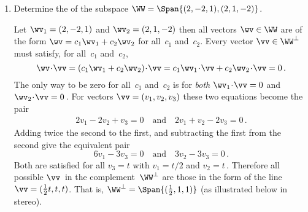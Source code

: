 \begin{reduce}
\begin{example}
\begin{enumerate}[ref=\ref{eg:orthsubsp}(\alph*)]
\item Determine the  of the subspace \(\WW=\Span\{(2,-2,1),(2,1,-2)\}\).
\begin{solution} 
Let \(\wv_1=(2,-2,1)\) and \(\wv_2=(2,1,-2)\) then all vectors \(\wv\in\WW\) are of the form \(\wv=c_1\wv_1+c_2\wv_2\) for all~\(c_1\) and~\(c_2\).
Every vector \(\vv\in\WW^\perp\) must satisfy, for all~\(c_1\) and~\(c_2\),
\begin{equation*}
\wv\cdot\vv=(c_1\wv_1+c_2\wv_2)\cdot\vv
=c_1\wv_1\cdot\vv+c_2\wv_2\cdot\vv
=0\,.
\end{equation*}
The only way to be zero for all~\(c_1\) and~\(c_2\) is for \emph{both} \(\wv_1\cdot\vv=0\) and \(\wv_2\cdot\vv=0\)\,.
For vectors \(\vv=(v_1,v_2,v_3)\) these two equations become the pair
\begin{eqnarray*}
2v_1-2v_2+v_3=0 \quad\text{and}\quad 2v_1+v_2-2v_3=0\,.
\end{eqnarray*}
Adding twice the second to the first, and subtracting the first from the second give the equivalent pair
\begin{equation*}
6v_1-3v_3=0\quad\text{and}\quad 3v_2-3v_3=0\,.
\end{equation*}
Both are satisfied for all \(v_3=t\) with \(v_1=t/2\) and \(v_2=t\)\,.
Therefore all possible \(\vv\)~in the complement~\(\WW^\perp\) are those in the form of the line \(\vv=(\tfrac12t,t,t)\).
That is, \(\WW^\perp=\Span\{(\tfrac12,1,1)\}\) (as illustrated below in stereo).
\begin{center}
\end{center}
\end{solution}

\end{enumerate}
\end{example}




\end{reduce}
